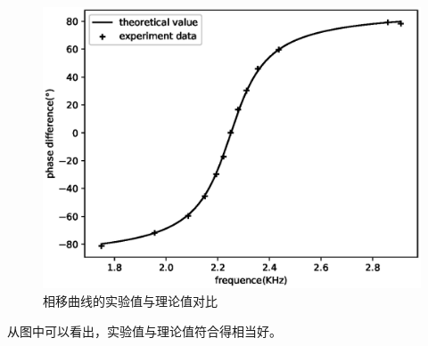 \documentclass[a4paper]{ctexart}
\begin{document}
    \begin{figure}[htbp]
        \centering
        \includegraphics[scale=0.75]{phase.eps}
        \caption{相移曲线的实验值与理论值对比}        
    \end{figure}
    \par 
    从图中可以看出，实验值与理论值符合得相当好。\\
\end{document}
